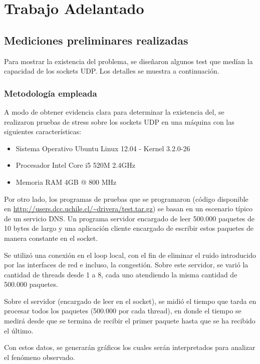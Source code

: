 \documentclass[12pt,spanish,letterpaper]{article}
\begin{document}
\section{Trabajo Adelantado}
\subsection{Mediciones preliminares realizadas}
\par Para mostrar la existencia del problema, se diseñaron algunos test que medían la capacidad de los sockets UDP. Los detalles se muestra a continuación.
\subsubsection{Metodología empleada}
\par A modo de obtener evidencia clara para determinar la existencia del, se realizaron pruebas de stress sobre los sockets UDP en una máquina con las siguientes características:
\begin{itemize}
	\item Sistema Operativo Ubuntu Linux 12.04 - Kernel 3.2.0-26
	\item Procesador Intel Core i5 520M 2.4GHz
	\item Memoria RAM 4GB @ 800 MHz
\end{itemize}
\par Por otro lado, los programas de pruebas que se programaron (código disponible en \url{http://users.dcc.uchile.cl/~drivera/test.tar.gz}) se basan en un escenario típico de un servicio DNS. Un programa servidor encargado de leer 500.000 paquetes de 10 bytes de largo y una aplicación cliente encargado de escribir estos paquetes de manera constante en el socket.
\par Se utilizó una conexión en el loop local, con el fin de eliminar el ruido introducido por las interfaces de red e incluso, la congestión. Sobre este servidor, se varió la cantidad de threads desde 1 a 8, cada uno atendiendo la misma cantidad de 500.000 paquetes.
\par Sobre el servidor (encargado de leer en el socket), se midió el tiempo que tarda en procesar todos los paquetes (500.000 por cada thread), en donde el tiempo se medirá desde que se termina de recibir el primer paquete hasta que se ha recibido el último.
\par Con estos datos, se generarán gráficos los cuales serán interpretados para analizar el fenómeno observado.
\end{document}
